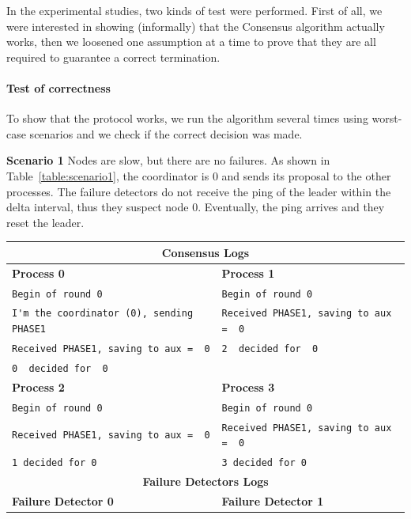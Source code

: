 \documentclass[a4paper]{article}
\begin{document}
In the experimental studies, two kinds of test were performed. First of all, we were interested in showing (informally) that the Consensus algorithm actually works, then we loosened one assumption at a time to prove that they are all required to guarantee a correct termination.

\paragraph{Test of correctness} To show that the protocol works, we run the algorithm several times using worst-case scenarios and we check if the correct decision was made.

\begin{compactitem}
\item \textbf{Scenario 1} Nodes are slow, but there are no failures. As shown in Table~\ref{table:scenario1}, the coordinator is $0$ and sends its proposal to the other processes. The failure detectors do not receive the ping of the leader within the delta interval, thus they suspect node $0$. Eventually, the ping arrives and they reset the leader.
	\begin{table}[H]
		\centering\scriptsize
        \begin{tabular}{ll}
		\toprule
        \multicolumn{2}{c}{\textbf{Consensus Logs}} \\
        \midrule
		\textbf{Process 0} & \textbf{Process 1} \\
		\midrule
        \verb|Begin of round 0| & \verb|Begin of round 0| \\
		\verb|I'm the coordinator (0), sending PHASE1| & \verb|Received PHASE1, saving to aux =  0| \\
		\verb|Received PHASE1, saving to aux =  0| & \verb|2  decided for  0| \\
		\verb|0  decided for  0| & \\
        \midrule
		\textbf{Process 2} & \textbf{Process 3} \\
		\midrule
        \verb|Begin of round 0| & \verb|Begin of round 0| \\
		\verb|Received PHASE1, saving to aux =  0| & \verb|Received PHASE1, saving to aux =  0| \\
		\verb|1 decided for 0| & \verb|3 decided for 0| \\
        \bottomrule\toprule
		\multicolumn{2}{c}{\textbf{Failure Detectors Logs}} \\
		\midrule
		\textbf{Failure Detector 0} & \textbf{Failure Detector 1} \\

\end{tabular}
\end{table}
\end{compactitem}
\end{document}
